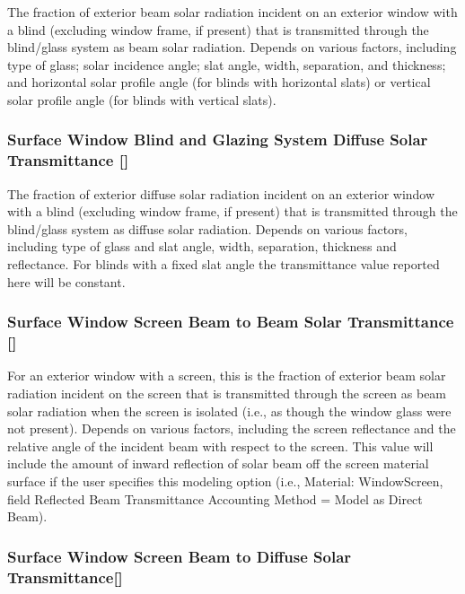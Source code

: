 The fraction of exterior beam solar radiation incident on an exterior window with a blind (excluding window frame, if present) that is transmitted through the blind/glass system as beam solar radiation. Depends on various factors, including type of glass; solar incidence angle; slat angle, width, separation, and thickness; and horizontal solar profile angle (for blinds with horizontal slats) or vertical solar profile angle (for blinds with vertical slats).

\subsubsection{Surface Window Blind and Glazing System Diffuse Solar Transmittance {[]}}\label{surface-window-blind-and-glazing-system-diffuse-solar-transmittance}

The fraction of exterior diffuse solar radiation incident on an exterior window with a blind (excluding window frame, if present) that is transmitted through the blind/glass system as diffuse solar radiation. Depends on various factors, including type of glass and slat angle, width, separation, thickness and reflectance. For blinds with a fixed slat angle the transmittance value reported here will be constant.

\subsubsection{Surface Window Screen Beam to Beam Solar Transmittance {[]}}\label{surface-window-screen-beam-to-beam-solar-transmittance}

For an exterior window with a screen, this is the fraction of exterior beam solar radiation incident on the screen that is transmitted through the screen as beam solar radiation when the screen is isolated (i.e., as though the window glass were not present). Depends on various factors, including the screen reflectance and the relative angle of the incident beam with respect to the screen. This value will include the amount of inward reflection of solar beam off the screen material surface if the user specifies this modeling option (i.e., Material: WindowScreen, field Reflected Beam Transmittance Accounting Method = Model as Direct Beam).

\subsubsection{Surface Window Screen Beam to Diffuse Solar Transmittance{[]}}\label{surface-window-screen-beam-to-diffuse-solar-transmittance}

